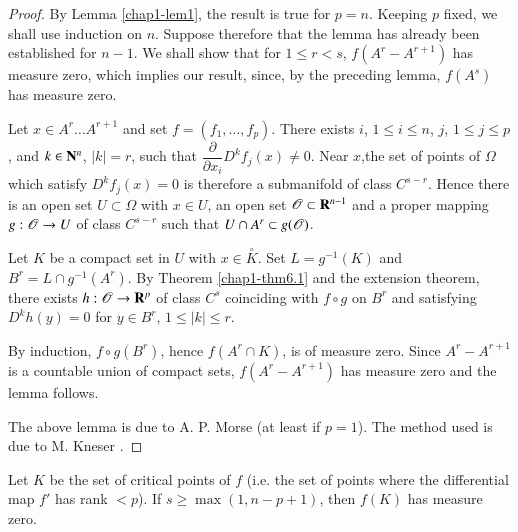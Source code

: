 \begin{proof}
By Lemma \ref{chap1-lem1}, the result is true for $p=n$. Keeping $p$ fixed, we shall use induction on $n$. Suppose therefore that the lemma has already been established for $n-1$. We shall show that for $1\leq r<s$, $f(A^{r}-A^{r+1})$ has measure zero, which implies our result, since, by the preceding lemma, $f(A^{s})$ has measure zero.

Let $x\in A^{r}\ldots A^{r+1}$ and set $f=(f_{1},\ldots,f_{p})$. There exists $i$, $1\leq i\leq n$, $j$, $1\leq j\leq p$, and $k\in \mathbf{N}^{n}$, $|k|=r$, such that $\dfrac{\partial}{\partial x_{i}}D^{k}f_{j}(x)\neq 0$. Near $x$,\pageoriginale the set of points of $\Omega$ which satisfy $D^{k}f_{j}(x)=0$ is therefore a submanifold of class $C^{s-r}$. Hence there is an open set $U\subset \Omega$ with $x\in U$, an open set $\mathscr{O}\subset \mathbf{R}^{n-1}$ and a proper mapping $g:\mathscr{O}\to U$ of class $C^{s-r}$ such that $U\cap A^{r}\subset g(\mathscr{O})$.

Let $K$ be a compact set in $U$ with $x\in \overset{\circ}{K}$. Set $L=g^{-1}(K)$ and $B^{r}=L\cap g^{-1}(A^{r})$. By Theorem \ref{chap1-thm6.1} and the extension theorem, there exists $h:\mathscr{O}\to \mathbf{R}^{p}$ of class $C^{s}$ coinciding with $f\circ g$ on $B^{r}$ and satisfying $D^{k}h(y)=0$ for $y\in B^{r}$, $1\leq |k|\leq r$.

By induction, $f\circ g(B^{r})$, hence $f(A^{r}\cap K)$, is of measure zero. Since $A^{r}-A^{r+1}$ is a countable union of compact sets, $f(A^{r}-A^{r+1})$ has measure zero and the lemma follows.

The above lemma is due to A. P. Morse \cite{A. P. Morse : 1} (at least if $p=1$). The method used is due to M. Kneser \cite{M. Kneser : 1}.
\end{proof}

\begin{theorem}\label{chap1-thm7.4}
Let $K$ be the set of critical points of $f$ (i.e. the set of points where the differential map $f'$ has rank $<p$). If $s\geq \max (1,n-p+1)$, then $f(K)$ has measure zero.
\end{theorem}

